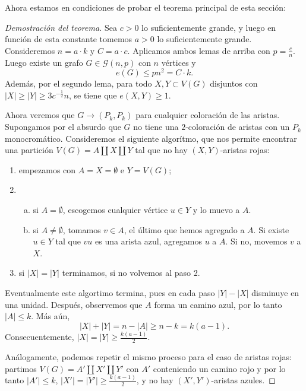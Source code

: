 \documentclass[12pt]{report}
\theoremstyle{plain}
\theoremstyle{definition}
\newcommand{\abs}[1]{\left \vert #1 \right \vert}
\begin{document}
Ahora estamos en condiciones de probar el teorema principal de esta sección:

\begin{proof}[Demostración del teorema]
Sea $c > 0$ lo suficientemente grande, y luego en función de esta constante tomemos $a>0$ lo suficientemente grande. Consideremos $n = a \cdot k$ y $C = a \cdot c$. Aplicamos ambos lemas de arriba con $p = \frac c n$. Luego existe un grafo $G \in \mathcal G (n,p)$ con $n$ vértices y
\[
    e(G) \leq pn^2 = C \cdot k  .
\]
Además, por el segundo lema, para todo $X,Y \subset V(G)$ disjuntos con $\abs X \geq \abs Y \geq 3 c^{- \frac 1 2}n$, se tiene que $e(X,Y) \geq 1$.

Ahora veremos que $G \longrightarrow (P_k, P_k)$ para cualquier coloración de las aristas. Supongamos por el absurdo que $G$ no tiene una $2$-coloración de aristas con un $P_k$ monocromático. Consideremos el siguiente algorítmo, que nos permite encontrar una partición $V(G) = A \coprod X \coprod Y$ tal que no hay $(X,Y)$-aristas rojas:
\begin{enumerate}
\item empezamos con $A = X = \emptyset$ e $Y = V(G)$;
\item
\begin{enumerate}[(a)]
\item si $A = \emptyset$, escogemos cualquier vértice $u \in Y$ y lo muevo a $A$.
\item si $A \neq \emptyset$, tomamos $v \in A$, el último que hemos agregado a $A$. Si existe $u \in Y$ tal que $v u$ es una arista azul, agregamos $u$ a $A$. Si no, movemos $v$ a $X$.
\end{enumerate}
\item si $\abs X = \abs Y$ terminamos, si no volvemos al paso 2.
\end{enumerate}

Eventualmente este algortimo termina, pues en cada paso $\abs Y - \abs X$ disminuye en una unidad. Después, observemos que $A$ forma un camino azul, por lo tanto $\abs A \leq k$. Más aún,
\[
    \abs X + \abs Y = n - \abs A \geq n - k = k (a-1).
\]
Consecuentemente, $\abs X = \abs Y \geq \frac {k (a-1)}{2}$.

Análogamente, podemos repetir el mismo proceso para el caso de aristas rojas: partimos $V(G) = A' \coprod X' \coprod Y'$ con $A'$ conteniendo un camino rojo y por lo tanto $\abs {A'} \leq k$, $\abs{X'} = \abs{Y'} \geq \frac{k(a-1)}{2}$, y no hay $(X',Y')$-aristas azules.


\end{proof}
\end{document}
